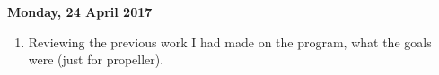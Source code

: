 \documentclass[10pt,letter]{article}
\begin{document}
\textbf{Monday, 24 April 2017}
\begin{enumerate} 
\item Reviewing the previous work I had made on the program, what the goals were (just for propeller). 

\end{enumerate} 
\end{document}
